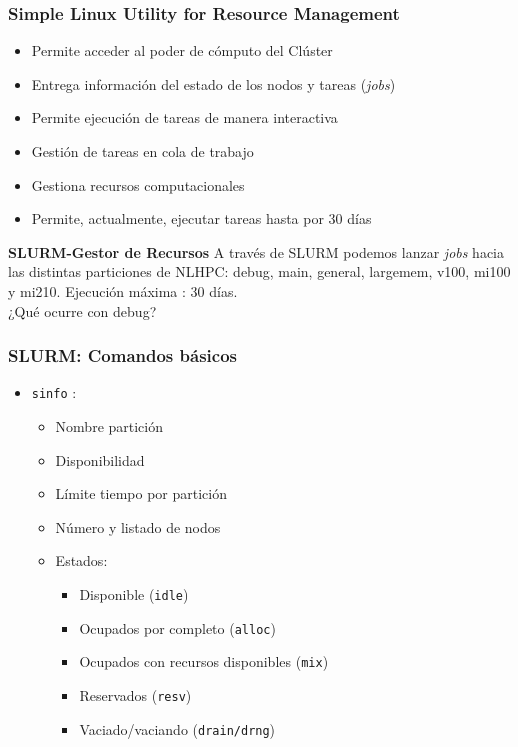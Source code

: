 \documentclass[aspectratio=169,professionalfonts]{beamer}
\begin{document}
\begin{frame}[fragile]
\frametitle{\textbf{Simple Linux Utility for Resource Management}}
\begin{itemize}
    \item  Permite acceder al poder de cómputo del Clúster
    \vspace{0.5em} 
    \item Entrega información del estado de los nodos y tareas (\textit{jobs})
    \vspace{0.5em} 
    \item Permite ejecución de tareas de manera interactiva 
    \vspace{0.5em} 
    \item Gestión de tareas en cola de trabajo 
    \vspace{0.5em} 
    \item Gestiona recursos computacionales 
    \vspace{0.5em} 
    \item Permite, actualmente, ejecutar tareas hasta por 30 días
    
\end{itemize}
    
\end{frame}

\begin{frame}{\textbf{SLURM-Gestor de Recursos}}
 A través de SLURM podemos lanzar \textit{jobs} hacia las distintas particiones de NLHPC: debug, main, general, largemem, v100, mi100 y mi210. Ejecución máxima : 30 días. \\ 
 \vspace{0.5em}
 ¿Qué ocurre con debug?
    
\end{frame}


\begin{frame}[fragile]
\frametitle{\textbf{SLURM: Comandos básicos}}
\begin{itemize}
    \item \texttt{sinfo} : 
    \begin{itemize}
        \item Nombre partición
        \item Disponibilidad
        \item Límite tiempo por partición
        \item Número y listado de nodos
        \item Estados:
        \begin{itemize}
            \item Disponible (\texttt{idle})
            \item Ocupados por completo (\texttt{alloc})
            \item Ocupados con recursos disponibles (\texttt{mix})
            \item Reservados (\texttt{resv})
            \item Vaciado/vaciando (\texttt{drain/drng})
        \end{itemize}
        
    \end{itemize}
\end{itemize}
\end{frame}
\end{document}
